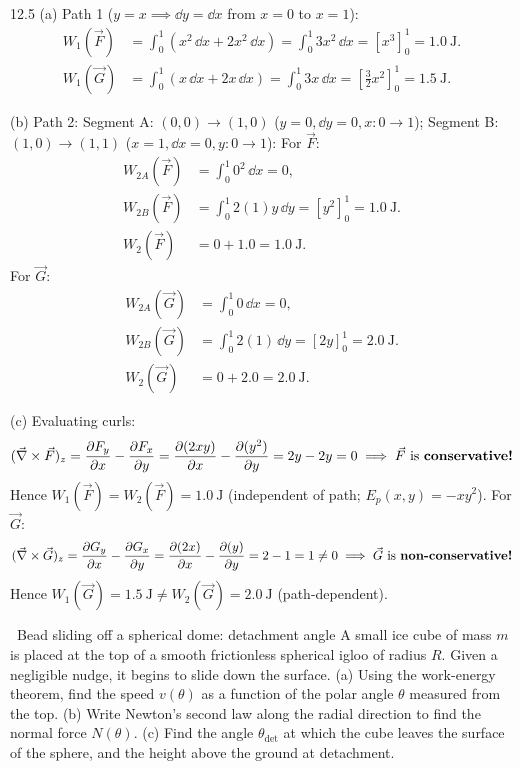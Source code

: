 \begin{solution}{12.5}
(a) Path 1 ($y = x \implies \dd y = \dd x$ from $x=0$ to $x=1$):
\begin{align*}
W_1(\vec{F}) &= \int_0^1 (x^2\,\dd x + 2x^2\,\dd x) = \int_0^1 3x^2\,\dd x = \left[ x^3 \right]_0^1 = \mathbf{1.0\ \mathrm{J}.} \\
W_1(\vec{G}) &= \int_0^1 (x\,\dd x + 2x\,\dd x) = \int_0^1 3x\,\dd x = \left[ \frac{3}{2}x^2 \right]_0^1 = \mathbf{1.5\ \mathrm{J}.}
\end{align*}

(b) Path 2: Segment A: $(0,0)\to(1,0)$ ($y=0, \dd y=0, x: 0\to 1$); Segment B: $(1,0)\to(1,1)$ ($x=1, \dd x=0, y: 0\to 1$):
For $\vec{F}$:
\begin{align*}
W_{2A}(\vec{F}) &= \int_0^1 0^2\,\dd x = 0, \\
W_{2B}(\vec{F}) &= \int_0^1 2(1)y\,\dd y = \left[ y^2 \right]_0^1 = 1.0\ \mathrm{J}. \\
W_2(\vec{F}) &= 0 + 1.0 = \mathbf{1.0\ \mathrm{J}.}
\end{align*}
For $\vec{G}$:
\begin{align*}
W_{2A}(\vec{G}) &= \int_0^1 0\,\dd x = 0, \\
W_{2B}(\vec{G}) &= \int_0^1 2(1)\,\dd y = \left[ 2y \right]_0^1 = 2.0\ \mathrm{J}. \\
W_2(\vec{G}) &= 0 + 2.0 = \mathbf{2.0\ \mathrm{J}.}
\end{align*}

(c) Evaluating curls:
\[
(\vec{\nabla}\times\vec{F})_z = \frac{\partial F_y}{\partial x} - \frac{\partial F_x}{\partial y} = \frac{\partial(2xy)}{\partial x} - \frac{\partial(y^2)}{\partial y} = 2y - 2y = 0 \implies \vec{F} \text{ is \textbf{conservative!}}
\]
Hence $W_1(\vec{F}) = W_2(\vec{F}) = 1.0\ \mathrm{J}$ (independent of path; $E_p(x, y) = -x y^2$).
For $\vec{G}$:
\[
(\vec{\nabla}\times\vec{G})_z = \frac{\partial G_y}{\partial x} - \frac{\partial G_x}{\partial y} = \frac{\partial(2x)}{\partial x} - \frac{\partial(y)}{\partial y} = 2 - 1 = 1 \ne 0 \implies \vec{G} \text{ is \textbf{non-conservative!}}
\]
Hence $W_1(\vec{G}) = 1.5\ \mathrm{J} \ne W_2(\vec{G}) = 2.0\ \mathrm{J}$ (path-dependent).
\end{solution}

\begin{exercise}{\core\ Bead sliding off a spherical dome: detachment angle}
A small ice cube of mass $m$ is placed at the top of a smooth frictionless spherical igloo of radius $R$. Given a negligible nudge, it begins to slide down the surface.
(a) Using the work-energy theorem, find the speed $v(\theta)$ as a function of the polar angle $\theta$ measured from the top.
(b) Write Newton's second law along the radial direction to find the normal force $N(\theta)$.
(c) Find the angle $\theta_{\text{det}}$ at which the cube leaves the surface of the sphere, and the height above the ground at detachment.
\end{exercise}

